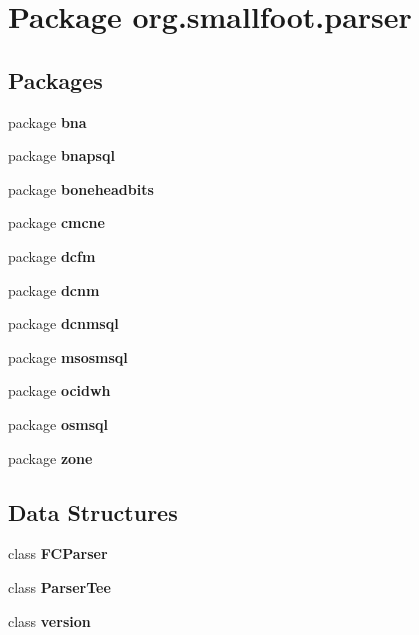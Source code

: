 \section{Package org.\+smallfoot.\+parser}
\label{namespaceorg_1_1smallfoot_1_1parser}
\subsection*{Packages}
\begin{DoxyCompactItemize}
\item 
package {\bf bna}
\item 
package {\bf bnapsql}
\item 
package {\bf boneheadbits}
\item 
package {\bf cmcne}
\item 
package {\bf dcfm}
\item 
package {\bf dcnm}
\item 
package {\bf dcnmsql}
\item 
package {\bf msosmsql}
\item 
package {\bf ocidwh}
\item 
package {\bf osmsql}
\item 
package {\bf zone}
\end{DoxyCompactItemize}
\subsection*{Data Structures}
\begin{DoxyCompactItemize}
\item 
class {\bf F\+C\+Parser}
\item 
class {\bf Parser\+Tee}
\item 
class {\bf version}
\end{DoxyCompactItemize}
